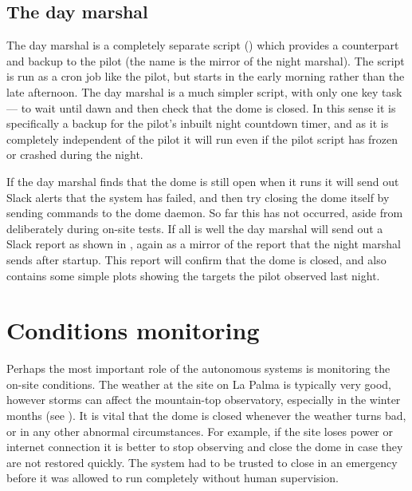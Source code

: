 
\subsection{The day marshal}
\label{sec:day_marshal}
\begin{colsection}

The day marshal is a completely separate script () which provides a counterpart and backup to the pilot (the name is the mirror of the night marshal). The script is run as a cron job like the pilot, but starts in the early morning rather than the late afternoon. The day marshal is a much simpler script, with only one key task --- to wait until dawn and then check that the dome is closed. In this sense it is specifically a backup for the pilot's inbuilt night countdown timer, and as it is completely independent of the pilot it will run even if the pilot script has frozen or crashed during the night.

If the day marshal finds that the dome is still open when it runs it will send out Slack alerts that the system has failed, and then try closing the dome itself by sending commands to the dome daemon. So far this has not occurred, aside from deliberately during on-site tests. If all is well the day marshal will send out a Slack report as shown in , again as a mirror of the report that the night marshal sends after startup. This report will confirm that the dome is closed, and also contains some simple plots showing the targets the pilot observed last night.

\end{colsection}


\section{Conditions monitoring}
\label{sec:conditions}


\begin{colsection}

Perhaps the most important role of the autonomous systems is monitoring the on-site conditions. The weather at the site on La Palma is typically very good, however storms can affect the mountain-top observatory, especially in the winter months (see ). It is vital that the dome is closed whenever the weather turns bad, or in any other abnormal circumstances. For example, if the site loses power or internet connection it is better to stop observing and close the dome in case they are not restored quickly. The system had to be trusted to close in an emergency before it was allowed to run completely without human supervision.

\end{colsection}

